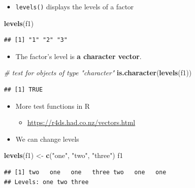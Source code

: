 \documentclass[]{book}
\newenvironment{Shaded}{\begin{snugshade}}{\end{snugshade}}
\newcommand{\CommentTok}[1]{\textcolor[rgb]{0.56,0.35,0.01}{\textit{#1}}}
\newcommand{\KeywordTok}[1]{\textcolor[rgb]{0.13,0.29,0.53}{\textbf{#1}}}
\newcommand{\NormalTok}[1]{#1}
\newcommand{\StringTok}[1]{\textcolor[rgb]{0.31,0.60,0.02}{#1}}
\providecommand{\tightlist}{%
  \setlength{\itemsep}{0pt}\setlength{\parskip}{0pt}}
\begin{document}
\begin{itemize}
\tightlist
\item
  \texttt{levels()} displays the levels of a factor
\end{itemize}

\begin{Shaded}
\begin{Highlighting}[]
\KeywordTok{levels}\NormalTok{(f1)}
\end{Highlighting}
\end{Shaded}

\begin{verbatim}
## [1] "1" "2" "3"
\end{verbatim}

\begin{itemize}
\tightlist
\item
  The factor's level is \textbf{a character vector}.
\end{itemize}

\begin{Shaded}
\begin{Highlighting}[]
\CommentTok{# test for objects of type "character"}
\KeywordTok{is.character}\NormalTok{(}\KeywordTok{levels}\NormalTok{(f1))}
\end{Highlighting}
\end{Shaded}

\begin{verbatim}
## [1] TRUE
\end{verbatim}

\begin{itemize}
\tightlist
\item
  More test functions in R

  \begin{itemize}
  \tightlist
  \item
    \url{https://r4ds.had.co.nz/vectors.html}
  \end{itemize}
\item
  We can change levels
\end{itemize}

\begin{Shaded}
\begin{Highlighting}[]
\KeywordTok{levels}\NormalTok{(f1) <-}\StringTok{ }\KeywordTok{c}\NormalTok{(}\StringTok{"one"}\NormalTok{, }\StringTok{"two"}\NormalTok{, }\StringTok{"three"}\NormalTok{)}
\NormalTok{f1}
\end{Highlighting}
\end{Shaded}

\begin{verbatim}
## [1] two   one   one   three two   one   one  
## Levels: one two three
\end{verbatim}
\end{document}
